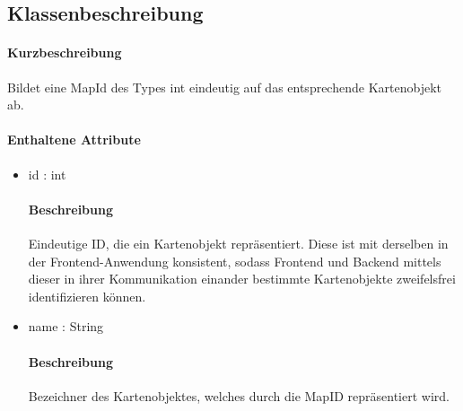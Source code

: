 \subsection{Klassenbeschreibung}%
\paragraph*{Kurzbeschreibung}
    Bildet eine MapId des Types int eindeutig auf das entsprechende Kartenobjekt ab.
\paragraph*{Enthaltene Attribute}
\begin{itemize}
    \item id : int
    	    \paragraph*{Beschreibung}
            Eindeutige ID, die ein Kartenobjekt repräsentiert. Diese ist mit derselben in der Frontend-Anwendung konsistent,
            sodass Frontend und Backend mittels dieser in ihrer Kommunikation einander bestimmte Kartenobjekte zweifelsfrei 
            identifizieren können. 
    \item name : String
            \paragraph{Beschreibung}
            Bezeichner des Kartenobjektes, welches durch die MapID repräsentiert wird.
\end{itemize}            

